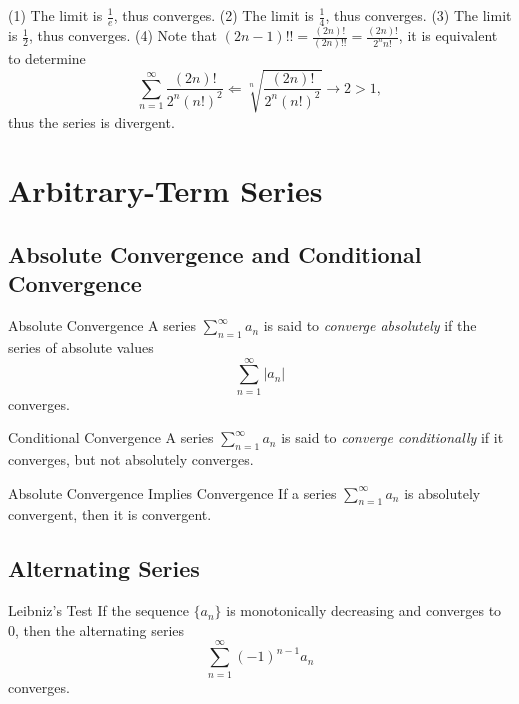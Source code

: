 \begin{solution}
  (1) The limit is $\frac{1}{e}$, thus converges.
  (2) The limit is $\frac{1}{4}$, thus converges.
  (3) The limit is $\frac{1}{2}$, thus converges.
  (4) Note that $(2n-1)!! = \frac{(2n)!}{(2n)!!} = \frac{(2n)!}{2^nn!}$,
  it is equivalent to determine
  \begin{equation}
    \sum\limits_{n = 1}^{\infty} \frac{(2n)!}{2^n(n!)^2}
    \Leftarrow
    \sqrt[n]{\frac{(2n)!}{2^n(n!)^2}} \rightarrow 2 > 1,
  \end{equation}
  thus the series is divergent.
\end{solution}

\section{Arbitrary-Term Series}

\subsection{Absolute Convergence and Conditional Convergence}

\begin{definition}{Absolute Convergence}{}
  A series $\sum\limits_{n = 1}^{\infty}a_n$ is said to \emph{converge absolutely}
  if the series of absolute values
  \begin{equation}
    \sum\limits_{n = 1}^{\infty} |a_n|
  \end{equation}
  converges.
\end{definition}

\begin{definition}{Conditional Convergence}{}
  A series $\sum\limits_{n = 1}^{\infty}a_n$ is said to \emph{converge conditionally}
  if it converges, but not absolutely converges.
\end{definition}

\begin{proposition}{Absolute Convergence Implies Convergence}{}
  If a series $\sum\limits_{n = 1}^{\infty} a_n$ is absolutely convergent,
  then it is convergent.
\end{proposition}

\subsection{Alternating Series}

\begin{theorem}{Leibniz's Test}{}
  If the sequence $\{a_n\}$ is monotonically decreasing and converges to $0$,
  then the alternating series
  \begin{equation}
    \sum\limits_{n = 1}^{\infty}(-1)^{n-1}a_n
  \end{equation}
  converges.
\end{theorem}

